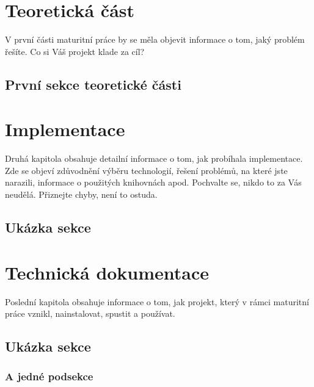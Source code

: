 




\setcounter{tocdepth}{2}
\tableofcontents

\chapter{Teoretická část}
\pagestyle{fancy}

V první části maturitní práce by se měla objevit informace o tom, jaký problém řešíte. Co si Váš projekt klade za cíl?

\section{První sekce teoretické části}

\lipsum


\chapter{Implementace}

Druhá kapitola obsahuje detailní informace o tom, jak probíhala implementace. Zde se objeví zdůvodnění výběru technologií, řešení problémů, na které jste narazili, informace o použitých knihovnách apod. Pochvalte se, nikdo to za Vás neudělá. Přiznejte chyby, není to ostuda.

\section{Ukázka sekce}

\lipsum

\chapter{Technická dokumentace}

Poslední kapitola obsahuje informace o tom, jak projekt, který v rámci maturitní práce vznikl, nainstalovat, spustit a používat.

\section{Ukázka sekce}

\lipsum[5]

\subsection{A jedné podsekce}

